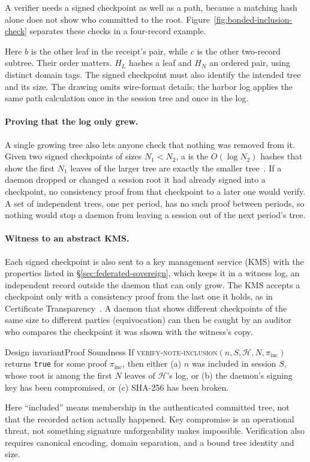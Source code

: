 \documentclass[11pt,a4paper]{article}
\theoremstyle{definition}
\theoremstyle{remark}
\begin{document}
A verifier needs a signed checkpoint as well as a path, because a matching
hash alone does not show who committed to the root.
Figure~\ref{fig:bonded-inclusion-check} separates these checks in a
four-record example.



Here $b$ is the other leaf in the receipt's pair, while $c$ is the other
two-record subtree. Their order matters. $H_L$ hashes a leaf and $H_N$ an
ordered pair, using distinct domain tags. The signed checkpoint must also
identify the intended tree and its size. The drawing omits wire-format
details; the harbor log applies the same path calculation once in the session
tree and once in the log.

\paragraph{Proving that the log only grew.} A single growing tree also lets
anyone check that nothing was removed from it. Given two signed checkpoints of
sizes $N_1<N_2$, a  is the $O(\log N_2)$ hashes
that show the first $N_1$ leaves of the larger tree are exactly the smaller
tree~. If a daemon dropped or changed a session root it
had already signed into a checkpoint, no consistency proof from that
checkpoint to a later one would verify. A set of independent trees, one per
period, has no such proof between periods, so nothing would stop a daemon
from leaving a session out of the next period's tree.

\paragraph{Witness to an abstract KMS.} Each signed checkpoint is also sent to a key management service (KMS) with the properties listed in \S\ref{sec:federated-sovereign}, which keeps it in a witness log, an independent record outside the daemon that can only grow. The KMS accepts a checkpoint only with a consistency proof from the last one it holds, as in Certificate Transparency~. A daemon that shows different checkpoints of the same size to different parties (equivocation) can then be caught by an auditor who compares the checkpoint it was shown with the witness's copy.

\begin{pdclaim}{Design invariant}{Proof Soundness}
\setlength{\parskip}{4pt plus 1pt}
\label{prop:proof-sound}
If \textsc{verify-note-inclusion}$(n,S,\mathcal{H},N,\pi_{\mathrm{inc}})$ returns \texttt{true} for some proof $\pi_{\mathrm{inc}}$, then either (a) $n$ was included in session $S$, whose root is among the first $N$ leaves of $\mathcal{H}$'s log, or (b) the daemon's signing key has been compromised, or (c) SHA-256 has been broken.

Here ``included'' means membership in the authenticated committed tree,
not that the recorded action actually happened. Key compromise is an operational
threat, not something signature unforgeability makes impossible. Verification
also requires canonical encoding, domain separation, and a bound tree identity
and size.
\end{pdclaim}
\end{document}
